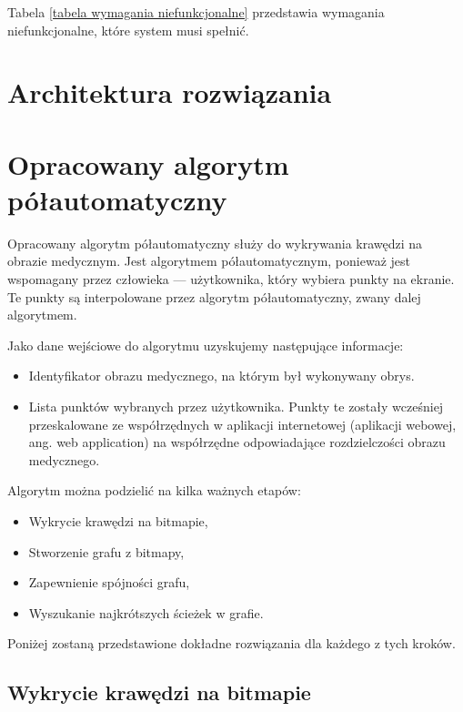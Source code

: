 \documentclass[a4paper,11pt,twoside]{report}
\theoremstyle{definition}
\begin{document}
Tabela \ref{tabela wymagania niefunkcjonalne} przedstawia wymagania niefunkcjonalne, które system musi spełnić.

\section {Architektura rozwiązania}

\section {Opracowany algorytm półautomatyczny}

Opracowany algorytm półautomatyczny służy do wykrywania krawędzi na obrazie medycznym. Jest algorytmem półautomatycznym, ponieważ jest wspomagany przez człowieka --- użytkownika, który wybiera punkty na ekranie. Te punkty są interpolowane przez algorytm półautomatyczny, zwany dalej algorytmem.

Jako dane wejściowe do algorytmu uzyskujemy następujące informacje:
\begin{itemize}[noitemsep]
\item {Identyfikator obrazu medycznego, na którym był wykonywany obrys.}
\item {Lista punktów wybranych przez użytkownika. Punkty te zostały wcześniej przeskalowane ze współrzędnych w aplikacji internetowej (aplikacji webowej, ang. web application) na współrzędne odpowiadające rozdzielczości obrazu medycznego.}
\end{itemize}


Algorytm można podzielić na kilka ważnych etapów:

\begin{itemize}[noitemsep]
\item {Wykrycie krawędzi na bitmapie,}
\item {Stworzenie grafu z bitmapy,}
\item {Zapewnienie spójności grafu,}
\item {Wyszukanie najkrótszych ścieżek w grafie.}
\end{itemize}

Poniżej zostaną przedstawione dokładne rozwiązania dla każdego z tych kroków. 
\subsection {Wykrycie krawędzi na bitmapie}
\end{document}
